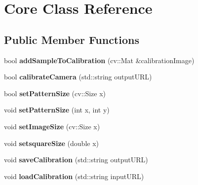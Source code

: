 \hypertarget{class_core}{\section{Core Class Reference}
\label{class_core}
}
\subsection*{Public Member Functions}
\begin{DoxyCompactItemize}
\item 
\hypertarget{class_core_a4b3fa472a964f4b508cd35bb5ec1deaf}{bool {\bfseries add\+Sample\+To\+Calibration} (cv\+::\+Mat \&calibration\+Image)}\label{class_core_a4b3fa472a964f4b508cd35bb5ec1deaf}

\item 
\hypertarget{class_core_a2b560da2ffef9507ad35095eac4dd3b1}{bool {\bfseries calibrate\+Camera} (std\+::string output\+U\+R\+L)}\label{class_core_a2b560da2ffef9507ad35095eac4dd3b1}

\item 
\hypertarget{class_core_a9c8b41dcb54fa82291de4493874c5b54}{bool {\bfseries set\+Pattern\+Size} (cv\+::\+Size x)}\label{class_core_a9c8b41dcb54fa82291de4493874c5b54}

\item 
\hypertarget{class_core_ae8db971d399e3f28f6b581fc12f4103f}{void {\bfseries set\+Pattern\+Size} (int x, int y)}\label{class_core_ae8db971d399e3f28f6b581fc12f4103f}

\item 
\hypertarget{class_core_ae663b429e2a0f4e342d8b0a0d3d6bc75}{void {\bfseries set\+Image\+Size} (cv\+::\+Size x)}\label{class_core_ae663b429e2a0f4e342d8b0a0d3d6bc75}

\item 
\hypertarget{class_core_a361151d555bdb5574e935b5da98c6c7b}{void {\bfseries setsquare\+Size} (double x)}\label{class_core_a361151d555bdb5574e935b5da98c6c7b}

\item 
\hypertarget{class_core_a9cc5571c896104412e62c2d4410768e3}{void {\bfseries save\+Calibration} (std\+::string output\+U\+R\+L)}\label{class_core_a9cc5571c896104412e62c2d4410768e3}

\item 
\hypertarget{class_core_a3d503fe9a22dfdd502c8c45e5426a4a0}{void {\bfseries load\+Calibration} (std\+::string input\+U\+R\+L)}\label{class_core_a3d503fe9a22dfdd502c8c45e5426a4a0}


\end{DoxyCompactItemize}
